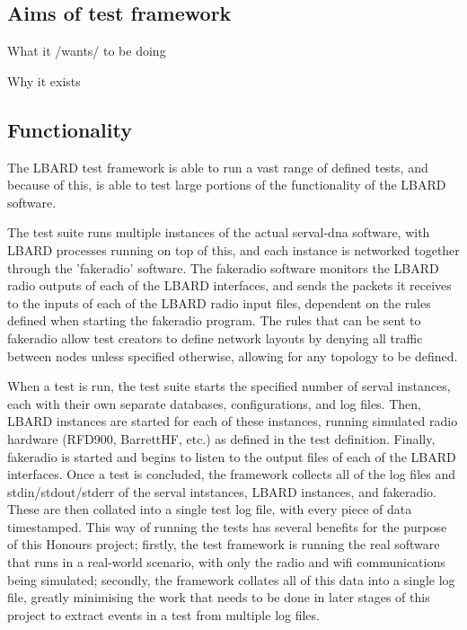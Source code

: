 \subsection{Aims of test framework}
What it /wants/ to be doing

Why it exists


\subsection{Functionality}
The LBARD test framework is able to run a vast range of defined tests, and because of this, is able to test large portions of the functionality of the LBARD software.

The test suite runs multiple instances of the actual serval-dna software, with LBARD processes running on top of this, and each instance is networked together through the 'fakeradio' software.
The fakeradio software monitors the LBARD radio outputs of each of the LBARD interfaces, and sends the packets it receives to the inputs of each of the LBARD radio input files, dependent on the rules defined when starting the fakeradio program.
The rules that can be sent to fakeradio allow test creators to define network layouts by denying all traffic between nodes unless specified otherwise, allowing for any topology to be defined.


When a test is run, the test suite starts the specified number of serval instances, each with their own separate databases, configurations, and log files.
Then, LBARD instances are started for each of these instances, running simulated radio hardware (RFD900, BarrettHF, etc.) as defined in the test definition.
Finally, fakeradio is started and begins to listen to the output files of each of the LBARD interfaces.
Once a test is concluded, the framework collects all of the log files and stdin/stdout/stderr of the serval intstances, LBARD instances, and fakeradio.
These are then collated into a single test log file, with every piece of data timestamped.
This way of running the tests has several benefits for the purpose of this Honours project; firstly, the test framework is running the real software that runs in a real-world scenario, with only the radio and wifi communications being simulated; secondly, the framework collates all of this data into a single log file, greatly minimising the work that needs to be done in later stages of this project to extract events in a test from multiple log files.

